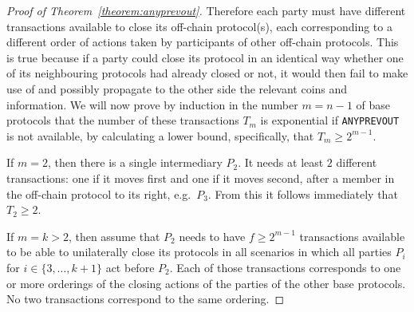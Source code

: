 \begin{proof}[Proof of Theorem~\ref{theorem:anyprevout}]
    Therefore each party must have different transactions available to close its
    off-chain protocol(s), each corresponding to a different order of actions
    taken by participants of other off-chain protocols. This is true because if
    a party could close its protocol in an identical way whether one of its
    neighbouring protocols had already closed or not, it would then fail to make
    use of and possibly propagate to the other side the relevant coins and
    information. We will now prove by induction in the number $m = n - 1$ of
    base protocols that the number of these transactions $T_m$ is exponential if
    \texttt{ANYPREVOUT} is not available, by calculating a lower bound, specifically,
    that $T_m \geq 2^{m-1}$. 

    If $m = 2$, then there is a single intermediary $P_2$. It needs at least $2$
    different transactions: one if it moves first and one if it moves second,
    after a member in the off-chain protocol to its right, e.g.\ $P_3$.
    From this it follows immediately that $T_2 \geq 2$. 

    If $m = k > 2$, then assume that $P_2$ needs to have $f\geq 2^{m-1}$ transactions
    available to be able to unilaterally close its protocols in all scenarios in
    which all parties $P_i$ for $i \in \{3, \dots, k+1\}$ act before $P_2$. Each
    of those transactions corresponds to one or more orderings of the closing
    actions of the parties of the other base protocols. No two transactions
    correspond to the same ordering.


\end{proof}
